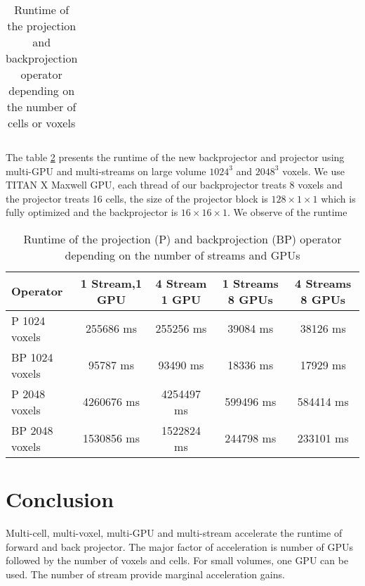\documentclass[12pt]{spieman}  %
\begin{document}
\begin{spacing}{1}
\begin{table}[h]
\begin{tabular}{||c c | c c||}
 \hline
\end{tabular}
    \caption{Runtime of the projection and backprojection operator depending on the number of cells or voxels}
    \label{tab:voxelcell}
\end{table}
The table \ref{tab:largevolume} presents the runtime of the new backprojector and projector using multi-GPU and multi-streams on large volume $1024^3$ and $2048^3$ voxels. We use TITAN X Maxwell GPU, each thread of our backprojector treats 8 voxels and the projector treats 16 cells, the size of the projector block is $128 \times 1 \times 1$ which is fully optimized and the backprojector is $16 \times 16 \times 1$. 
We observe of the runtime 
\begin{table}[h]
\centering
 \begin{tabular}{||l c c c c||} 
  \hline
 Operator &  1 Stream,1 GPU  & 4 Stream 1 GPU & 1 Streams 8 GPUs & 4 Streams 8 GPUs \\
 \hline\hline
 P 1024 voxels & 255686 ms & 255256 ms & 39084 ms & 38126 ms \\ 
 \hline
 BP 1024 voxels  & 95787 ms & 93490 ms & 18336 ms & 17929 ms \\
 \hline
 P 2048 voxels & 4260676 ms & 4254497 ms & 599496 ms & 584414 ms
 \\
 \hline
 BP 2048 voxels & 1530856 ms & 1522824 ms & 244798 ms & 233101 ms\\ 
 \hline
\end{tabular}
\label{tab:largevolume}
    \caption{Runtime of the projection (P) and backprojection (BP) operator depending on the number of streams and GPUs}
\end{table}

\section{Conclusion}

Multi-cell, multi-voxel, multi-GPU and  multi-stream accelerate the runtime of forward and back projector. The major factor of acceleration is number of GPUs followed by the number of voxels and cells. For small volumes, one GPU can be used. The number of stream provide marginal acceleration gains.





\end{spacing}
\end{document}

